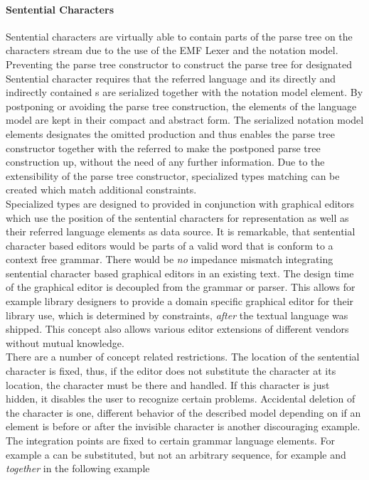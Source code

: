 \paragraph{Sentential Characters}
Sentential characters are virtually able to contain parts of the parse tree on the characters stream due to the use of the EMF Lexer and the notation model. Preventing the parse tree constructor to construct the parse tree for designated Sentential character requires that the referred language  and its directly and indirectly contained s are serialized together with the notation model element. By postponing or avoiding the parse tree construction, the elements of the language model are kept in their compact and abstract form. The serialized notation model elements designates the omitted production and thus enables the parse tree constructor together with the referred  to make the postponed parse tree construction up, without the need of any further information. Due to the extensibility of the parse tree constructor, specialized types matching can be created which match additional constraints.  \\
Specialized types are designed to provided in conjunction with graphical editors which use the position of the sentential characters for representation as well as their referred language elements as data source. It is remarkable, that sentential character based editors would be parts of a valid word that is conform to a context free grammar. There would be \emph{no} impedance mismatch integrating sentential character based graphical editors in an existing text. The design time of the graphical editor is decoupled from the grammar or parser. This allows for example library designers to provide a domain specific graphical editor for their library use, which is determined by constraints, \emph{after} the textual language was shipped. This concept also allows various editor extensions of different vendors without mutual knowledge.\\
There are a number of concept related restrictions. The location of the sentential character is fixed, thus, if the editor does not substitute the character at its location, the character must be there and handled. If this character is just hidden, it disables the user to recognize certain problems. Accidental deletion of the character is one, different behavior of the described model depending on if an element is before or after the invisible character is another discouraging example. The integration points are fixed to certain grammar language elements. For example a  can be substituted, but not an arbitrary sequence, for example  and  \emph{together} in the following example\\
